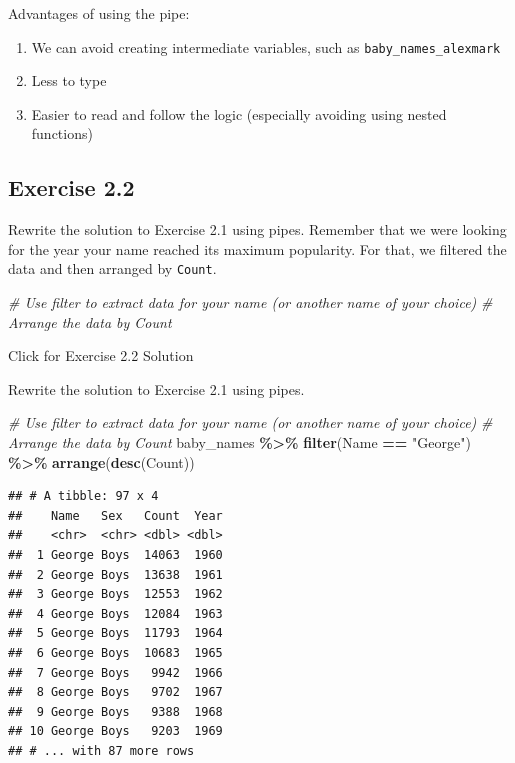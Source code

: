 \documentclass[
]{book}
\newenvironment{Shaded}{\begin{snugshade}}{\end{snugshade}}
\newcommand{\CommentTok}[1]{\textcolor[rgb]{0.56,0.35,0.01}{\textit{#1}}}
\newcommand{\KeywordTok}[1]{\textcolor[rgb]{0.13,0.29,0.53}{\textbf{#1}}}
\newcommand{\NormalTok}[1]{#1}
\newcommand{\OperatorTok}[1]{\textcolor[rgb]{0.81,0.36,0.00}{\textbf{#1}}}
\newcommand{\StringTok}[1]{\textcolor[rgb]{0.31,0.60,0.02}{#1}}
\providecommand{\tightlist}{%
  \setlength{\itemsep}{0pt}\setlength{\parskip}{0pt}}
\begin{document}
Advantages of using the pipe:

\begin{enumerate}
\def\labelenumi{\arabic{enumi}.}
\tightlist
\item
  We can avoid creating intermediate variables, such as \texttt{baby\_names\_alexmark}
\item
  Less to type
\item
  Easier to read and follow the logic (especially avoiding using nested functions)
\end{enumerate}

\hypertarget{exercise-2.2}{%
\subsection{Exercise 2.2}\label{exercise-2.2}}

Rewrite the solution to Exercise 2.1 using pipes. Remember that we were looking for the year your name reached its maximum popularity. For that, we filtered the data and then arranged by \texttt{Count}.

\begin{Shaded}
\begin{Highlighting}[]
\CommentTok{\# Use filter to extract data for your name (or another name of your choice)}
\CommentTok{\# Arrange the data by Count}
\end{Highlighting}
\end{Shaded}

{Click for Exercise 2.2 Solution}

\begin{alert}

Rewrite the solution to Exercise 2.1 using pipes.

\begin{Shaded}
\begin{Highlighting}[]
\CommentTok{\# Use filter to extract data for your name (or another name of your choice)}
\CommentTok{\# Arrange the data by Count}
\NormalTok{baby\_names }\OperatorTok{\%\textgreater{}\%}\StringTok{ }
\StringTok{    }\KeywordTok{filter}\NormalTok{(Name }\OperatorTok{==}\StringTok{ "George"}\NormalTok{) }\OperatorTok{\%\textgreater{}\%}
\StringTok{    }\KeywordTok{arrange}\NormalTok{(}\KeywordTok{desc}\NormalTok{(Count))}
\end{Highlighting}
\end{Shaded}

\begin{verbatim}
## # A tibble: 97 x 4
##    Name   Sex   Count  Year
##    <chr>  <chr> <dbl> <dbl>
##  1 George Boys  14063  1960
##  2 George Boys  13638  1961
##  3 George Boys  12553  1962
##  4 George Boys  12084  1963
##  5 George Boys  11793  1964
##  6 George Boys  10683  1965
##  7 George Boys   9942  1966
##  8 George Boys   9702  1967
##  9 George Boys   9388  1968
## 10 George Boys   9203  1969
## # ... with 87 more rows
\end{verbatim}

\end{alert}
\end{document}
